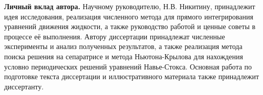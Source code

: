 
{\bf Личный вклад автора.} 
Научному руководителю, Н.В. Никитину, принадлежит идея исследования, реализация численного метода для прямого интегрирования уравнений движения жидкости, а также руководство работой и ценные советы в процессе её выполнения. Автору диссертации принадлежат численные эксперименты и анализ полученных результатов, а также реализация метода поиска решения на сепаратрисе и метода Ньютона-Крылова для нахождения условно периодических решений уравнений Навье-Стокса. Основная работа по подготовке текста диссертации и иллюстративного материала также принадлежит диссертанту. 


